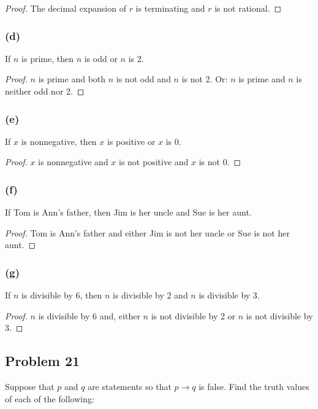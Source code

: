 \documentclass[14pt]{extarticle}
\begin{document}
\begin{proof}
The decimal expansion of $r$ is terminating and $r$ is not rational.
\end{proof}

\subsubsection{(d)}
If $n$ is prime, then $n$ is odd or $n$ is 2.

\begin{proof}
$n$ is prime and both $n$ is not odd and $n$ is not 2. Or: $n$ is prime and $n$ is neither odd nor 2.
\end{proof}

\subsubsection{(e)}
If $x$ is nonnegative, then $x$ is positive or $x$ is 0.

\begin{proof}
$x$ is nonnegative and $x$ is not positive and $x$ is not 0.
\end{proof}

\subsubsection{(f)}
If Tom is Ann’s father, then Jim is her uncle and Sue is her aunt.

\begin{proof}
Tom is Ann’s father and either Jim is not her uncle or Sue is not her aunt.
\end{proof}

\subsubsection{(g)}
If $n$ is divisible by 6, then $n$ is divisible by 2 and $n$ is divisible by 3.

\begin{proof}
$n$ is divisible by 6 and, either $n$ is not divisible by 2 or $n$ is not divisible by 3.
\end{proof}

\subsection{Problem 21}
Suppose that $p$ and $q$ are statements so that $p \to q$ is false. Find the truth values of each of the following:
\end{document}
